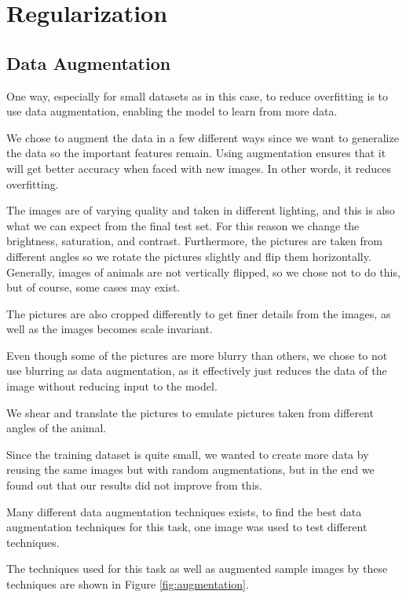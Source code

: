\section{Regularization}

\subsection{Data Augmentation}
One way, especially for small datasets as in this case, to reduce overfitting is to use data augmentation, enabling the model to learn from more data.

We chose to augment the data in a few different ways since we want to generalize the data so the important features remain. 
Using augmentation ensures that it will get better accuracy when faced with new images. In other words, it reduces overfitting.

The images are of varying quality and taken in different lighting, and this is also what we can expect from the final test set.
For this reason we change the brightness, saturation, and contrast. Furthermore, the pictures are taken from different angles so we rotate the pictures slightly and flip them horizontally. Generally, images of animals are not vertically flipped, so we chose not to do this, but of course, some cases may exist.

The pictures are also cropped differently to get finer details from the images, as well as the images becomes scale invariant.

Even though some of the pictures are more blurry than others, we chose to not use blurring as data augmentation, as it effectively just reduces the data of the image without reducing input to the model.

We shear and translate the pictures to emulate pictures taken from different angles of the animal.

Since the training dataset is quite small, we wanted to create more data by reusing the same images but with random augmentations, but in the end we found out that our results did not improve from this.


Many different data augmentation techniques exists, to find the best data augmentation techniques for this task, one image was used to test different techniques.



The techniques used for this task as well as augmented sample images by these techniques are shown in Figure \ref{fig:augmentation}.

